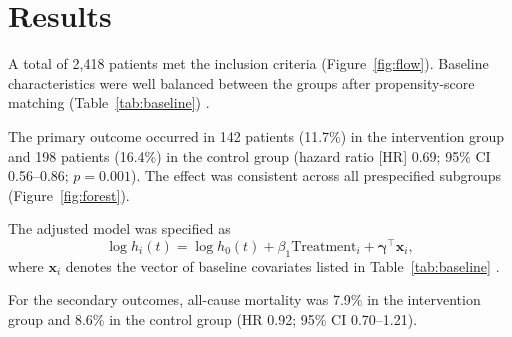 \section{Results}
\label{sec:results}

A total of 2,418 patients met the inclusion criteria (Figure~\ref{fig:flow}). Baseline characteristics were well balanced between the groups after propensity-score matching (Table~\ref{tab:baseline}) \cite{austin2011introduction}.

The primary outcome occurred in 142 patients (11.7\%) in the intervention group and 198 patients (16.4\%) in the control group (hazard ratio [HR] 0.69; 95\% CI 0.56--0.86; $p = 0.001$). The effect was consistent across all prespecified subgroups (Figure~\ref{fig:forest}).

The adjusted model was specified as
\begin{equation}
  \log h_i(t) = \log h_0(t) + \beta_1 \text{Treatment}_i + \boldsymbol{\gamma}^\top \mathbf{x}_i ,
  \label{eq:cox}
\end{equation}
where $\mathbf{x}_i$ denotes the vector of baseline covariates listed in Table~\ref{tab:baseline} \cite{cox1972regression, therneau2000modeling}.

For the secondary outcomes, all-cause mortality was 7.9\% in the intervention group and 8.6\% in the control group (HR 0.92; 95\% CI 0.70--1.21).

